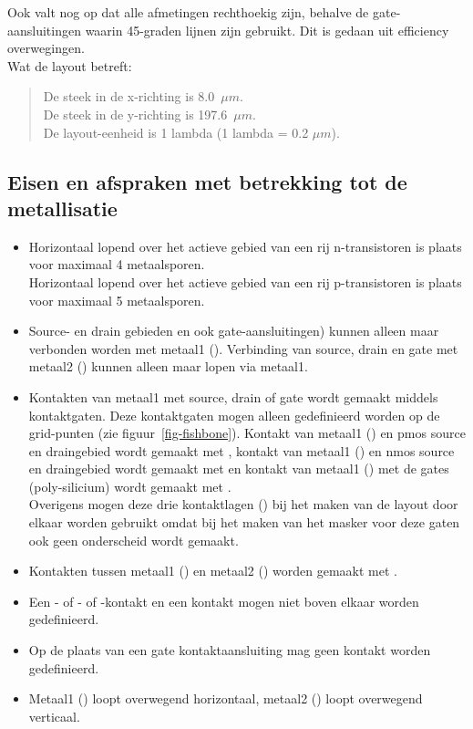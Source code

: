 Ook valt nog op dat alle afmetingen rechthoekig zijn, behalve
de gate-aansluitingen waarin 45-graden lijnen zijn gebruikt.
Dit is gedaan uit efficiency overwegingen.\\
Wat de layout betreft:

\begin{quote}
De steek in de x-richting is 8.0~$\mu m$.\\
De steek in de y-richting is 197.6~$\mu m$.\\
De layout-eenheid is 1 lambda (1 lambda = 0.2 $\mu m$).
\end{quote}

\subsection{Eisen en afspraken met betrekking tot de metallisatie}
\label{eisen_metal}
\begin{itemize}
\item
Horizontaal lopend over het actieve gebied van een rij
n-transistoren is plaats voor maximaal 4 metaalsporen.\\
Horizontaal lopend over het actieve gebied van een rij
p-transistoren is plaats voor maximaal 5 metaalsporen.
\item
Source- en drain gebieden en ook gate-aansluitingen) kunnen
alleen maar verbonden worden met metaal1 (). 
Verbinding van source, drain en gate 
met metaal2 () kunnen alleen maar lopen via metaal1.
\item
Kontakten van metaal1 met source, drain of gate wordt gemaakt 
middels kontaktgaten.
Deze kontaktgaten mogen alleen gedefinieerd worden op de grid-punten
(zie figuur~\ref{fig-fishbone}).
Kontakt van metaal1 () en pmos source en 
draingebied wordt gemaakt met , kontakt van metaal1 () 
en nmos source en draingebied wordt gemaakt met  en 
kontakt van metaal1 () met de gates (poly-silicium) 
wordt gemaakt met .\\
Overigens mogen deze drie kontaktlagen () bij het maken 
van de layout door elkaar worden gebruikt omdat bij het maken van het masker
voor deze gaten ook geen onderscheid wordt gemaakt.
\item
Kontakten tussen metaal1 () en metaal2 () worden 
gemaakt met .
\item
Een - of - of -kontakt en een 
kontakt mogen niet boven elkaar worden gedefinieerd.
\item
Op de plaats van een gate kontaktaansluiting mag geen  kontakt
worden gedefinieerd.
\item
Metaal1 () loopt overwegend horizontaal, metaal2 () loopt
overwegend verticaal.
\end{itemize}

